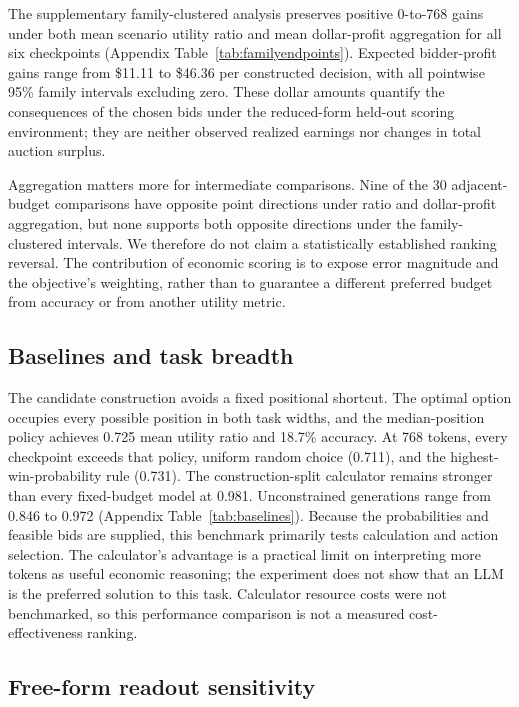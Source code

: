 \documentclass{article}
\begin{document}
The supplementary family-clustered analysis preserves positive 0-to-768 gains under both mean scenario utility ratio and mean dollar-profit aggregation for all six checkpoints (Appendix Table~\ref{tab:familyendpoints}). Expected bidder-profit gains range from \$11.11 to \$46.36 per constructed decision, with all pointwise 95\% family intervals excluding zero. These dollar amounts quantify the consequences of the chosen bids under the reduced-form held-out scoring environment; they are neither observed realized earnings nor changes in total auction surplus.

Aggregation matters more for intermediate comparisons. Nine of the 30 adjacent-budget comparisons have opposite point directions under ratio and dollar-profit aggregation, but none supports both opposite directions under the family-clustered intervals. We therefore do not claim a statistically established ranking reversal. The contribution of economic scoring is to expose error magnitude and the objective's weighting, rather than to guarantee a different preferred budget from accuracy or from another utility metric.

\subsection{Baselines and task breadth}

The candidate construction avoids a fixed positional shortcut. The optimal option occupies every possible position in both task widths, and the median-position policy achieves 0.725 mean utility ratio and 18.7\% accuracy. At 768 tokens, every checkpoint exceeds that policy, uniform random choice (0.711), and the highest-win-probability rule (0.731). The construction-split calculator remains stronger than every fixed-budget model at 0.981. Unconstrained generations range from 0.846 to 0.972 (Appendix Table~\ref{tab:baselines}). Because the probabilities and feasible bids are supplied, this benchmark primarily tests calculation and action selection. The calculator's advantage is a practical limit on interpreting more tokens as useful economic reasoning; the experiment does not show that an LLM is the preferred solution to this task. Calculator resource costs were not benchmarked, so this performance comparison is not a measured cost-effectiveness ranking.

\subsection{Free-form readout sensitivity}
\end{document}
